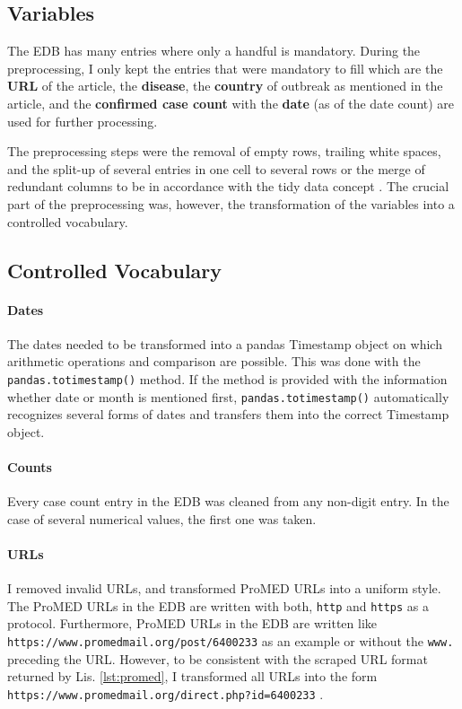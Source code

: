\subsection{Variables}
  The EDB has many entries where only a handful is mandatory.
  During the preprocessing, I only kept the entries that were mandatory to fill which are
  the \textbf{URL} of the article, the \textbf{disease}, the \textbf{country} of outbreak as mentioned in the article, and the \textbf{confirmed case count} with the \textbf{date} (as of the date count) are used for further processing.

  The preprocessing steps were the removal of empty rows, trailing white spaces, and the split-up of several entries in one cell to several rows or the merge of redundant columns to be in accordance with the tidy data concept \citep{Wickham2014}.
  The crucial part of the preprocessing was, however, the transformation of the variables into a controlled vocabulary.

\subsection{Controlled Vocabulary}\label{controlled vocabulary}
  \paragraph{Dates}
    The dates needed to be transformed into a pandas Timestamp object on which arithmetic operations and comparison are possible.
    This was done with the \texttt{pandas.totimestamp()} method.
    If the method is provided with the information whether date or month is mentioned first, \texttt{pandas.totimestamp()} automatically recognizes several forms of dates and transfers them into the correct Timestamp object.

  \paragraph{Counts}
    Every case count entry in the EDB was cleaned from any non-digit entry.
    In the case of several numerical values, the first one was taken.

  \paragraph{URLs}
    I removed invalid URLs, and transformed ProMED URLs into a uniform style. The ProMED URLs in the EDB are written with both, \texttt{http} and \texttt{https} as a protocol. Furthermore, ProMED URLs in the EDB are written like \textquotesingle \texttt{https://\allowbreak www.promedmail.org\allowbreak /post\allowbreak /6400233} \textquotesingle as an example or without the \texttt{www.} preceding the URL. However, to be consistent with the scraped URL format returned by Lis. \ref{lst:promed}, I transformed all URLs into the form \textquotesingle \texttt{https://\allowbreak www.promedmail.org/\allowbreak direct.php?id=6400233} \textquotesingle.

